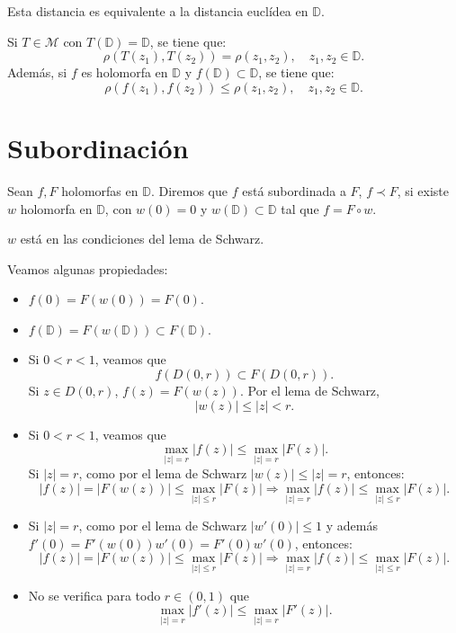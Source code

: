 Esta distancia es equivalente a la distancia euclídea en $\mathbb{D}$.

Si $T \in \mathcal{M}$ con $T(\mathbb{D}) = \mathbb{D}$, se tiene que:
$$\rho(T(z_1), T(z_2)) = \rho(z_1, z_2), \quad z_1, z_2 \in \mathbb{D}.$$
Además, si $f$ es holomorfa en $\mathbb{D}$ y $f(\mathbb{D}) \subset \mathbb{D}$, se tiene que:
$$\rho(f(z_1), f(z_2)) \leq \rho(z_1, z_2), \quad z_1, z_2 \in \mathbb{D}.$$

\section{Subordinación}
\begin{definition}
    Sean $f, F$ holomorfas en $\mathbb{D}$.
    Diremos que $f$ está subordinada a $F$, $f \prec F$, si existe $w$ holomorfa en $\mathbb{D}$, con $w(0) = 0$ y $w(\mathbb{D}) \subset \mathbb{D}$ tal que $f = F \circ w$.
\end{definition}

\begin{remark}
    $w$ está en las condiciones del lema de Schwarz.
\end{remark}

Veamos algunas propiedades:
\begin{itemize}
    \item $f(0) = F(w(0)) = F(0)$.
    \item $f(\mathbb{D}) = F(w(\mathbb{D})) \subset F(\mathbb{D})$.
    \item Si $0 < r < 1$, veamos que
          $$f(D(0, r)) \subset F(D(0, r)).$$
          Si $z \in D(0, r)$, $f(z) = F(w(z))$.
          Por el lema de Schwarz,
          $$|w(z)| \leq |z| < r.$$
    \item Si $0 < r < 1$, veamos que
          $$\max_{|z|=r} |f(z)| \leq \max_{|z|=r} |F(z)|.$$
          Si $|z| = r$, como por el lema de Schwarz $|w(z)| \leq |z| = r$, entonces:
          $$|f(z)| = |F(w(z))| \leq \max_{|z| \leq r} |F(z)| \Rightarrow \max_{|z|=r} |f(z)| \leq \max_{|z| \leq r} |F(z)|.$$
    \item Si $|z| = r$, como por el lema de Schwarz $|w'(0)| \leq 1$ y además $f'(0) = F'(w(0))w'(0) = F'(0)w'(0)$, entonces:
          $$|f(z)| = |F(w(z))| \leq \max_{|z| \leq r} |F(z)| \Rightarrow \max_{|z|=r} |f(z)| \leq \max_{|z| \leq r} |F(z)|.$$
    \item No se verifica para todo $r \in (0, 1)$ que
          $$\max_{|z|=r} |f'(z)| \leq \max_{|z|=r} |F'(z)|.$$
\end{itemize}

